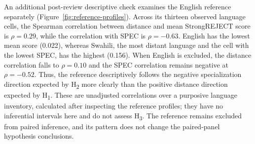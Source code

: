 An additional post-review descriptive check examines the English reference separately (Figure~\ref{fig:reference-profiles}). Across its thirteen observed language cells, the Spearman correlation between distance and mean StrongREJECT score is $\rho=0.29$, while the correlation with SPEC is $\rho=-0.63$. English has the lowest mean score (0.022), whereas Swahili, the most distant language and the cell with the lowest SPEC, has the highest (0.156). When English is excluded, the distance correlation falls to $\rho=0.10$ and the SPEC correlation remains negative at $\rho=-0.52$. Thus, the reference descriptively follows the negative specialization direction expected by H\textsubscript{2} more clearly than the positive distance direction expected by H\textsubscript{1}. These are unadjusted correlations over a purposive language inventory, calculated after inspecting the reference profiles; they have no inferential intervals here and do not assess H\textsubscript{3}. The reference remains excluded from paired inference, and its pattern does not change the paired-panel hypothesis conclusions.
